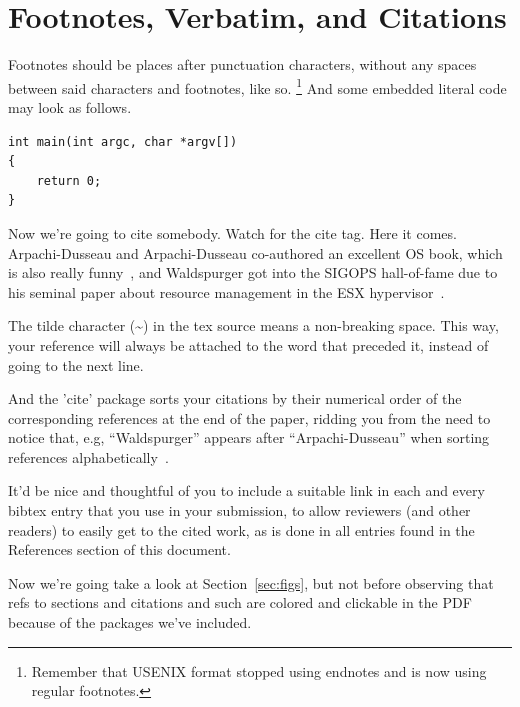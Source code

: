\section{Footnotes, Verbatim, and Citations}

Footnotes should be places after punctuation characters, without any
spaces between said characters and footnotes, like so.%
\footnote{Remember that USENIX format stopped using endnotes and is
  now using regular footnotes.} And some embedded literal code may
look as follows.

\begin{verbatim}
int main(int argc, char *argv[]) 
{
    return 0;
}
\end{verbatim}

Now we're going to cite somebody. Watch for the cite tag. Here it
comes. Arpachi-Dusseau and Arpachi-Dusseau co-authored an excellent OS
book, which is also really funny~\cite{arpachiDusseau18:osbook}, and
Waldspurger got into the SIGOPS hall-of-fame due to his seminal paper
about resource management in the ESX hypervisor~\cite{waldspurger02}.

The tilde character (\~{}) in the tex source means a non-breaking
space. This way, your reference will always be attached to the word
that preceded it, instead of going to the next line.

And the 'cite' package sorts your citations by their numerical order
of the corresponding references at the end of the paper, ridding you
from the need to notice that, e.g, ``Waldspurger'' appears after
``Arpachi-Dusseau'' when sorting references
alphabetically~\cite{waldspurger02,arpachiDusseau18:osbook}. 

It'd be nice and thoughtful of you to include a suitable link in each
and every bibtex entry that you use in your submission, to allow
reviewers (and other readers) to easily get to the cited work, as is
done in all entries found in the References section of this document.

Now we're going take a look at Section~\ref{sec:figs}, but not before
observing that refs to sections and citations and such are colored and
clickable in the PDF because of the packages we've included.
